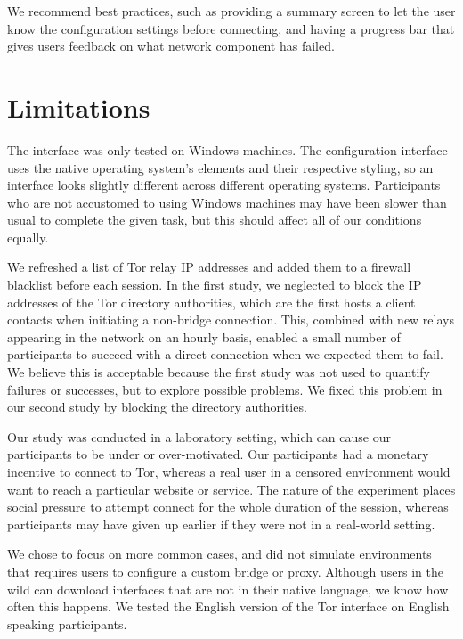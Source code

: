 \documentclass[USenglish,oneside,twocolumn]{article}
\begin{document}
We recommend best practices, such as providing a summary screen to let the user know the configuration settings before connecting, and having a progress bar that gives users feedback on what network component has failed.

\section{Limitations} 
The interface was only tested on Windows machines. The configuration interface uses the native operating system's elements and their respective styling, so an interface looks slightly different across different operating systems. Participants who are not accustomed to using Windows machines may have been slower than usual to complete the given task, but this should affect all of our conditions equally. 

We refreshed a list of Tor relay IP addresses and added them
to a firewall blacklist before each session.
In the first study, we neglected to block the IP addresses
of the Tor directory authorities, which are the first hosts
a client contacts when initiating a non-bridge connection.
This, combined with new relays appearing in the network on an hourly basis,
enabled a small number of participants to succeed with
a direct connection when we expected them to fail.
We believe this is acceptable because 
the first study was not used to quantify failures or successes, 
but to explore possible problems.
We fixed this problem in our second study by blocking the directory authorities.


Our study was conducted in a laboratory setting, which can cause our participants to be under or over-motivated. Our participants had a monetary incentive to connect to Tor, whereas a real user in a censored environment would want to reach a particular website or service. The nature of the experiment places social pressure to attempt connect for the whole duration of the session, whereas participants may have given up earlier if they were not in a real-world setting.   

We chose to focus on more common cases, and did not simulate environments that requires users to configure a custom bridge or proxy. Although users in the wild can download interfaces that are not in their native language, we know how often this happens. We tested the English version of the Tor interface on English speaking participants. 
\end{document}
